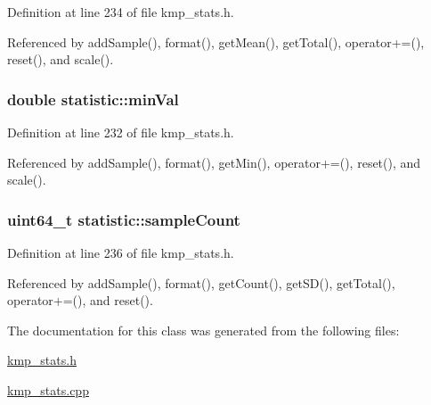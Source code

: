 Definition at line 234 of file kmp\-\_\-stats.\-h.



Referenced by add\-Sample(), format(), get\-Mean(), get\-Total(), operator+=(), reset(), and scale().

\hypertarget{classstatistic_acc6389ee86b103a599905e63222463cc}{
\subsubsection[{min\-Val}]{\setlength{\rightskip}{0pt plus 5cm}double statistic\-::min\-Val\hspace{0.3cm}{\ttfamily [private]}}}\label{classstatistic_acc6389ee86b103a599905e63222463cc}


Definition at line 232 of file kmp\-\_\-stats.\-h.



Referenced by add\-Sample(), format(), get\-Min(), operator+=(), reset(), and scale().

\hypertarget{classstatistic_a0e548b7b46e603d290a3b2be7cfde18d}{
\subsubsection[{sample\-Count}]{\setlength{\rightskip}{0pt plus 5cm}uint64\-\_\-t statistic\-::sample\-Count\hspace{0.3cm}{\ttfamily [private]}}}\label{classstatistic_a0e548b7b46e603d290a3b2be7cfde18d}


Definition at line 236 of file kmp\-\_\-stats.\-h.



Referenced by add\-Sample(), format(), get\-Count(), get\-S\-D(), get\-Total(), operator+=(), and reset().



The documentation for this class was generated from the following files\-:\begin{DoxyCompactItemize}
\item 
\hyperlink{kmp__stats_8h}{kmp\-\_\-stats.\-h}\item 
\hyperlink{kmp__stats_8cpp}{kmp\-\_\-stats.\-cpp}\end{DoxyCompactItemize}
